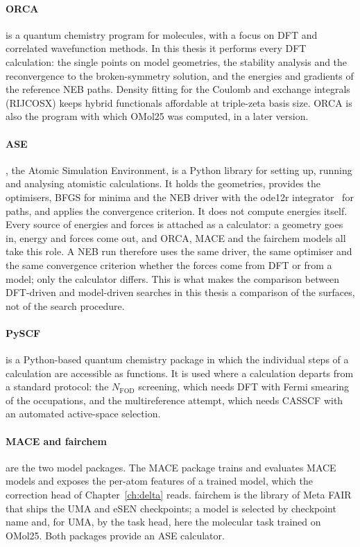 \paragraph{ORCA} is a quantum chemistry program for molecules, with a
focus on DFT and correlated wavefunction methods. In this thesis it
performs every DFT calculation: the single points on model geometries,
the stability analysis and the reconvergence to the broken-symmetry
solution, and the energies and gradients of the reference NEB paths.
Density fitting for the Coulomb and exchange integrals (RIJCOSX) keeps
hybrid functionals affordable at triple-zeta basis size. ORCA is also the
program with which OMol25 was computed, in a later version.

\paragraph{ASE}, the Atomic Simulation Environment, is a Python library
for setting up, running and analysing atomistic calculations. It holds
the geometries, provides the optimisers, BFGS for minima and the NEB
driver with the ode12r integrator~\cite{makri2019preconditioning} for
paths, and applies the convergence criterion. It does not compute
energies itself. Every source of energies and forces is attached as a
calculator: a geometry goes in, energy and forces come out, and ORCA,
MACE and the fairchem models all take this role. A NEB run therefore uses
the same driver, the same optimiser and the same convergence criterion
whether the forces come from DFT or from a model; only the calculator
differs. This is what makes the comparison between DFT-driven and
model-driven searches in this thesis a comparison of the surfaces, not
of the search procedure.

\paragraph{PySCF} is a Python-based quantum chemistry package in which
the individual steps of a calculation are accessible as functions. It is
used where a calculation departs from a standard protocol: the
$N_\text{FOD}$ screening, which needs DFT with Fermi smearing of the
occupations, and the multireference attempt, which needs CASSCF with an
automated active-space selection.

\paragraph{MACE and fairchem} are the two model packages. The MACE
package trains and evaluates MACE models and exposes the per-atom
features of a trained model, which the correction head of
Chapter~\ref{ch:delta} reads. fairchem is the library of Meta FAIR that
ships the UMA and eSEN checkpoints; a model is selected by checkpoint
name and, for UMA, by the task head, here the molecular task trained on
OMol25. Both packages provide an ASE calculator.
